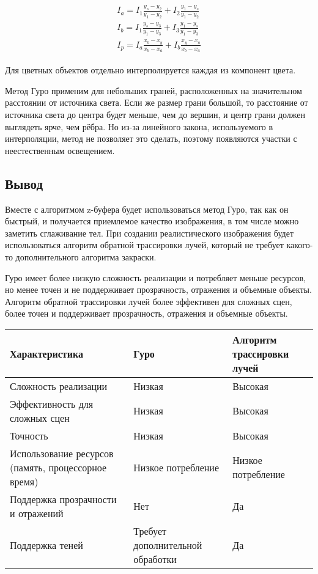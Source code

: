 	
	
	\begin{align}
		\begin{gathered}
		I_a = I_1\frac{y_s - y_2}{y_1 - y_2} + I_2 \frac{y_1 - y_s}{y_1 - y_2}\\
		I_b =I_1\frac{y_s - y_3}{y_1 - y_3} + I_3 \frac{y_1 - y_s}{y_1 - y_3}\\
		I_p =I_a\frac{x_b - x_y}{x_b - x_a} + I_b \frac{x_y - x_a}{x_b - x_a}
		\end{gathered}
	\end{align}
	
	Для цветных объектов отдельно интерполируется каждая из компонент цвета.
	
	Метод Гуро применим для небольших граней, расположенных на значительном расстоянии от источника света. Если же размер грани большой, то расстояние от источника света до центра будет меньше, чем до вершин, и центр грани должен выглядеть ярче, чем рёбра. Но из-за линейного закона, используемого в интерполяции, метод не позволяет это сделать, поэтому появляются участки с неестественным освещением.
	
	\subsection{Вывод}
	Вместе с алгоритмом z-буфера будет использоваться метод Гуро, так как он быстрый, и получается приемлемое качество изображения, в том числе можно заметить сглаживание тел. При создании реалистического изображения будет использоваться алгоритм обратной трассировки лучей, который не требует какого-то дополнительного алгоритма закраски.
	
	
	Гуро имеет более низкую сложность реализации и потребляет меньше ресурсов, но менее точен и не поддерживает прозрачность, отражения и объемные объекты. Алгоритм обратной трассировки лучей более эффективен для сложных сцен, более точен и поддерживает прозрачность, отражения и объемные объекты.
	
		\begin{tabular}{|p{5cm}|p{5cm}|p{5cm}|}
		\hline
		Характеристика & Гуро & Алгоритм трассировки лучей \\
		\hline
		Сложность реализации & Низкая & Высокая \\
		\hline
		Эффективность для сложных сцен & Низкая & Высокая \\
		\hline
		Точность & Низкая & Высокая \\
		\hline
		Использование ресурсов (память, процессорное время) & Низкое потребление & Низкое потребление \\
		\hline
		Поддержка прозрачности и отражений & Нет & Да \\
		\hline
		Поддержка теней & Требует дополнительной обработки & Да \\
		\hline
	\end{tabular}
